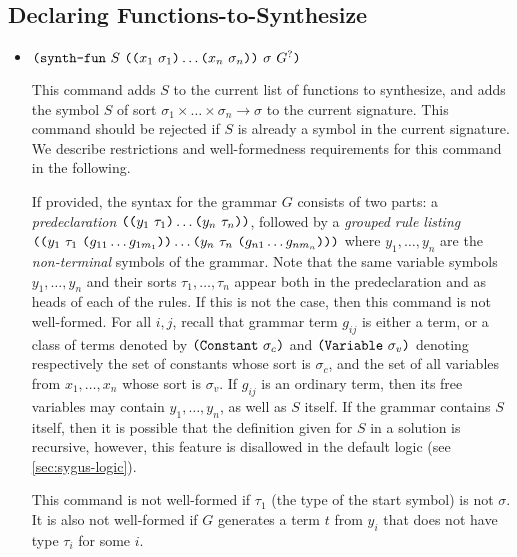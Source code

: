 \documentclass[english,a4paper,10pt]{article}
\begin{document}
\subsection{Declaring Functions-to-Synthesize}
\label{ssec:dec-synth-fun}

\begin{itemize}
\item $\texttt{(}\texttt{synth-fun}\mbox{ }S\mbox{ }
\texttt{(}\texttt{(}x_1\mbox{ }\sigma_1\texttt{)} \ldots \texttt{(}x_n\mbox{ }\sigma_n\texttt{)} \texttt{)}\mbox{ }\sigma\mbox{ }
G^{?}\texttt{)}$

This command adds $S$ to the current list of functions to synthesize,
and adds the symbol $S$ of 
sort $\sigma_1 \times \ldots \times \sigma_n \rightarrow \sigma$
to the current signature.
This command should be rejected if $S$ is already
a symbol in the current signature.
We describe restrictions and well-formedness requirements for this command
in the following.

If provided, the syntax for the grammar $G$
consists of two parts: 
a \emph{predeclaration}
$\texttt{(}\texttt{(}y_1\mbox{ }\tau_1\texttt{)} \ldots \texttt{(}y_n\mbox{ }\tau_n\texttt{)}\texttt{)}$,
followed by a \emph{grouped rule listing}
$\texttt{(}\texttt{(}y_1\mbox{ }\tau_1\mbox{ }\texttt{(}g_{11} \ldots g_{1m_1} \texttt{)} \texttt{)} \ldots \texttt{(}y_n\mbox{ }\tau_n\mbox{ }\texttt{(}g_{n1} \ldots g_{nm_n} \texttt{)} \texttt{)}\texttt{)}$
where $y_1, \ldots, y_n$ are the \emph{non-terminal} symbols of the grammar.
Note that the same variable symbols
$y_1, \ldots, y_n$ and their sorts 
$\tau_1, \ldots, \tau_n$ appear both in the predeclaration and as heads
of each of the rules.
If this is not the case, then this command is not well-formed.
For all $i,j$, recall that grammar term $g_{ij}$ is either a term, or a class of terms
denoted by $\texttt{(}\texttt{Constant}\mbox{ }\sigma_c\texttt{)}$ 
and $\texttt{(}\texttt{Variable}\mbox{ }\sigma_v\texttt{)}$ denoting respectively
the set of constants whose sort is $\sigma_c$,
and the set of all variables from $x_1, \ldots, x_n$ whose sort is $\sigma_v$.
If $g_{ij}$ is an ordinary term, then its free variables may contain $y_1, \ldots, y_n$,
as well as $S$ itself.
If the grammar contains $S$ itself, then it is possible that the definition
given for $S$ in a solution is recursive, however,
this feature is disallowed in the default logic (see \cref{sec:sygus-logic}).

This command is not well-formed if
$\tau_1$ (the type of the start symbol) is not $\sigma$.
It is also not well-formed if
$G$ generates a term $t$ from $y_i$
that does not have type $\tau_i$ for some $i$.


\end{itemize}
\end{document}
